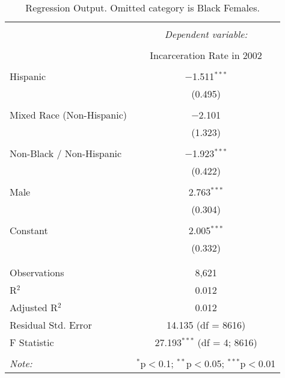 
\begin{table}[!htbp] \centering 
  \caption{Regression Output. Omitted category is Black Females.} 
  \label{tab:regression} 
\begin{tabular}{@{\extracolsep{5pt}}lc} 
\\[-1.8ex]\hline 
\hline \\[-1.8ex] 
 & \multicolumn{1}{c}{\textit{Dependent variable:}} \\ 
\cline{2-2} 
\\[-1.8ex] & Incarceration Rate in 2002 \\ 
\hline \\[-1.8ex] 
 Hispanic & $-$1.511$^{***}$ \\ 
  & (0.495) \\ 
  & \\ 
 Mixed Race (Non-Hispanic) & $-$2.101 \\ 
  & (1.323) \\ 
  & \\ 
 Non-Black / Non-Hispanic & $-$1.923$^{***}$ \\ 
  & (0.422) \\ 
  & \\ 
 Male & 2.763$^{***}$ \\ 
  & (0.304) \\ 
  & \\ 
 Constant & 2.005$^{***}$ \\ 
  & (0.332) \\ 
  & \\ 
\hline \\[-1.8ex] 
Observations & 8,621 \\ 
R$^{2}$ & 0.012 \\ 
Adjusted R$^{2}$ & 0.012 \\ 
Residual Std. Error & 14.135 (df = 8616) \\ 
F Statistic & 27.193$^{***}$ (df = 4; 8616) \\ 
\hline 
\hline \\[-1.8ex] 
\textit{Note:}  & \multicolumn{1}{r}{$^{*}$p$<$0.1; $^{**}$p$<$0.05; $^{***}$p$<$0.01} \\ 
\end{tabular} 
\end{table} 
